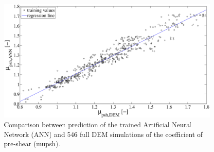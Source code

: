 \begin{figure}%
\centering 
\includegraphics[width=.80\columnwidth]{images/022regression.eps}
\caption[Comparison between prediction of the trained ANN and full DEM
simulation]{Comparison between prediction of the trained Artificial Neural
Network (\acs{ANN}) and 546 
full DEM simulations of the coefficient of pre-shear
(\acs{mupsh}).}
\label{fig:022regression} 
\end{figure}